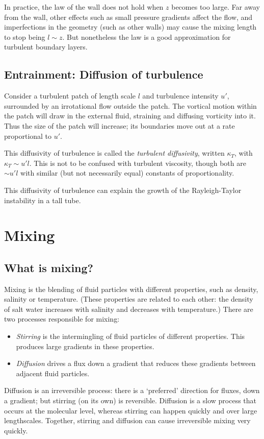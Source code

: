 In practice, the law of the wall does not hold when $z$ becomes too large. Far
away from the wall, other effects such as small pressure gradients affect the
flow, and imperfections in the geometry (such as other walls) may cause the
mixing length to stop being $l\sim z$. But nonetheless the law is a good
approximation for turbulent boundary layers. 

\subsection{Entrainment: Diffusion of turbulence}

Consider a turbulent patch of length scale $l$ and turbulence intensity $u'$,
surrounded by an irrotational flow outside the patch. The vortical motion within
the patch will draw in the external fluid, straining and diffusing vorticity
into it. Thus the size of the patch will increase; its boundaries move out at a
rate proportional to $u'$. 

This diffusivity of turbulence is called the \textit{turbulent diffusivity},
written $\kappa_T$, with $\kappa_T \sim u'l$. This is not to be confused with
turbulent viscosity, though both are $\sim u'l$ with similar (but not
necessarily equal) constants of proportionality.

This diffusivity of turbulence can explain the growth of the Rayleigh-Taylor
instability in a tall tube. 

\section{Mixing}

\subsection{What is mixing?}

Mixing is the blending of fluid particles with different properties, such as
density, salinity or temperature. (These properties are related to each other:
the density of salt water increases with salinity and decreases with
temperature.) There are two processes responsible for mixing:
\begin{itemize}
    \item \textit{Stirring} is the intermingling of fluid particles of different
        properties. This produces large gradients in these properties.
    \item \textit{Diffusion} drives a flux down a gradient that reduces these
        gradients between adjacent fluid particles.
\end{itemize}
Diffusion is an irreversible process: there is a `preferred' direction for
fluxes, down a gradient; but stirring (on its own) is reversible. Diffusion is a
slow process that occurs at the molecular level, whereas stirring can happen
quickly and over large lengthscales. Together, stirring and diffusion can cause
irreversible mixing very quickly.

